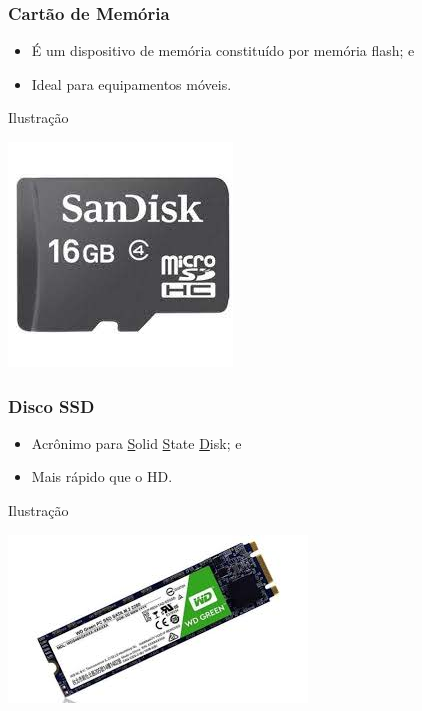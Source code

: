 \documentclass[aspectratio=169]{beamer} %
\begin{document}
\begin{frame}
	\frametitle{Cartão de Memória}
		
	\begin{itemize}
		\item É um dispositivo de memória constituído por memória flash; e 
		\item Ideal para equipamentos móveis.
	\end{itemize}\vfill
	
	\begin{exampleblock}{Ilustra\c cão}
		\begin{center}
			\includegraphics[scale=0.4]{img/cartao_de_memoria}
		\end{center}
	\end{exampleblock}
\end{frame}

\begin{frame}
	\frametitle{Disco SSD}
		
	\begin{itemize}
		\item Acrônimo para \underline{S}olid \underline{S}tate \underline{D}isk; e
		\item Mais rápido que o HD.
	\end{itemize}\vfill
	
	\begin{exampleblock}{Ilustra\c cão}
		\begin{center}
			\includegraphics[scale=0.4]{img/ssd}
		\end{center}
	\end{exampleblock}
\end{frame}
\end{document}
